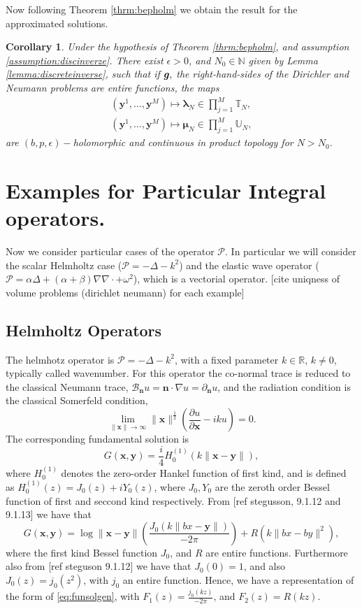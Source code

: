 \documentclass{article}
\newtheorem{corollary}[theorem]{Corollary}
\newcommand{\todo}[1]{{\color{red}[#1]}}
\newcommand{\bmu} {\bm{\mu}}
\newcommand{\bg}{\bm{g}}
\newcommand{\IN}{{\mathbb N}}
\newcommand{\IR}{{\mathbb R}}
\newcommand{\IU}{{\mathbb U}}
\newcommand{\IT}{{\mathbb T}}
\newcommand{\cP}{\mathcal{P}}
\newcommand{\bla}{\boldsymbol \lambda}
\newcommand{\bn}{\bm{n}}
\newcommand{\bx}{\bm{x}}
\newcommand{\by}{\bm{y}}
\begin{document}
Now following Theorem \ref{thrm:bepholm} we obtain the result for the approximated solutions.

\begin{corollary}
Under the hypothesis of Theorem \ref{thrm:bepholm}, and assumption \ref{assumption:discinverze}. There exist $\epsilon >0$, and $N_0 \in \IN$ given by Lemma \ref{lemma:discreteinverse}, such that if $\bg, \bf$ the right-hand-sides of the Dirichler and Neumann problems are  entire functions, the maps 
\begin{align*}
(\by^1,\hdots,\by^M) \mapsto \bla_N \in  \prod_{j=1}^M \IT_N ,\\
(\by^1,\hdots,\by^M) \mapsto \bmu_N \in  \prod_{j=1}^M \IU_N ,
\end{align*}
are $(b,p,\epsilon)-$holomorphic and continuous in product topology for $N > N_0$. 
\end{corollary} 

\section{Examples for Particular Integral operators.}
Now we consider particular cases of the operator $\cP$. In particular we will consider the scalar Helmholtz case ($\cP  = -\Delta - k^2$) and the elastic wave operator 
($\cP = 
\alpha \Delta + (\alpha +\beta) \nabla \nabla \cdot  + \omega^2
$), which is a vectorial operator.
\todo{cite uniqness of volume problems (dirichlet neumann) for each example}
\subsection{Helmholtz Operators}
The helmhotz operator is $\cP = -\Delta -k^2$, with a fixed parameter $k \in \IR$, $k\neq 0$, typically called wavenumber. For this operator the co-normal trace is reduced to the classical Neumann trace, $\mathbf{\mathcal{B}}_{\bn}u = \bn \cdot \nabla u  = \partial_{\bn} u$, and the radiation condition is the classical Somerfeld condition, 
$$
\lim_{\|\bx\| \rightarrow \infty}
\| \bx \|^{\frac{1}{2}}\left( \frac{\partial u}{\partial \bx}-i k u\right)=0.
$$
The corresponding fundamental solution is
$$
G(\bx,\by) = \frac{i}{4}H^{(1)}_0(k \| \bx-\by\|),
$$
where $H^{(1)}_0$ denotes the zero-order Hankel function of first kind, and is defined as $H^{(1)}_0(z) = J_0(z) + i Y_0(z)$, where $J_0, Y_0$ are the zeroth order Bessel function of first and seccond kind respectively. From \todo{ref stegusson, 9.1.12 and 9.1.13} we have that 
$$
G(\bx,\by) = \log\|\bx-\by\|\left(\frac{J_0(k \|bx -\by\|)}{-2\pi}\right)+ R(k\|bx-by\|^2),
$$
where the first kind Bessel function $J_0$, and $R$ are entire functions.
Furthermore also from \todo{ref steguson 9.1.12} we have that $J_0(0) = 1$, and also $J_0(z) = j_0(z^2)$, with $j_0$ an entire function.  Hence, we have a representation of the form of \eqref{eq:funsolgen}, with $F_1(z) = \frac{j_0(k z)}{-2\pi}$, and $F_2(z) = R(k z)$.
\end{document}
